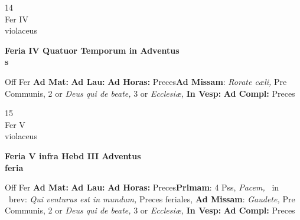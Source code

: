 \documentclass[10pt, openany]{book}
\begin{document}
        \begin{center}
            \begin{minipage}{3.5in}
                \vspace{2em}
                \begin{minipage}{0.5in}
                    {\Huge 14} \\
                    {\normalsize Fer IV} \\
                    {\normalsize violaceus}
                \end{minipage}
                \begin{minipage}{3.0in}
                    \textbf{ \large Feria IV Quatuor Temporum in Adventus \\
                    \textnormal{\normalsize s}} \\ 
                \end{minipage}
                \begin{justify}Off Fer
                    \textbf{Ad Mat: }
                    \textbf{Ad Lau: }
                    \textbf{Ad Horas: }Preces\textbf{Ad Missam}: \textit{Rorate cæli,} Pre Communis, 2 or \textit{Deus qui de beate,} 3 or \textit{Ecclesiæ,}  
                    \textbf{In Vesp: }
                    \textbf{Ad Compl: }Preces
                \end{justify}
            \end{minipage}
        \end{center}
    
        \begin{center}
            \begin{minipage}{3.5in}
                \vspace{2em}
                \begin{minipage}{0.5in}
                    {\Huge 15} \\
                    {\normalsize Fer V} \\
                    {\normalsize violaceus}
                \end{minipage}
                \begin{minipage}{3.0in}
                    \textbf{ \large Feria V infra Hebd III Adventus \\
                    \textnormal{\normalsize feria}} \\ 
                \end{minipage}
                \begin{justify}Off Fer
                    \textbf{Ad Mat: }
                    \textbf{Ad Lau: }
                    \textbf{Ad Horas: }Preces\textbf{Primam}: 4 Pss, \textit{Pacem,} \Vbar\ in \Rbar\ brev: \textit{Qui venturus est in mundum,} Preces feriales, \textbf{Ad Missam}: \textit{Gaudete,} Pre Communis, 2 or \textit{Deus qui de beate,} 3 or \textit{Ecclesiæ,}  
                    \textbf{In Vesp: }
                    \textbf{Ad Compl: }Preces
                \end{justify}
            \end{minipage}
        \end{center}
    
\end{document}
